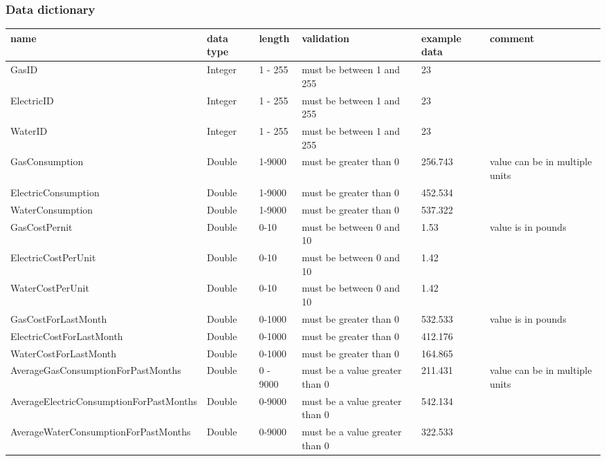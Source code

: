\subsubsection{Data dictionary}
\begin{center}
\begin{tabular}{|p{3cm}|p{1cm}|p{1.5cm}|p{3cm}|p{2cm}|p{3.5cm}|}
	\hline
	\textbf{name} & \textbf{data type} & \textbf{length} & \textbf{validation} & \textbf{example data} & \textbf{comment} \\ \hline
	GasID & Integer & 1 - 255 & must be between 1 and 255 & 23 &  \\ \hline
	ElectricID & Integer & 1 - 255 & must be between 1 and 255 & 23 &  \\ \hline
	WaterID & Integer & 1 - 255 & must be between 1 and 255 & 23 &  \\ \hline
	GasConsumption & Double & 1-9000 & must be greater than 0 & 256.743 & value can be in multiple units \\ \hline
	ElectricConsumption & Double & 1-9000 & must be greater than 0 & 452.534 &  \\ \hline
	WaterConsumption & Double & 1-9000 & must be greater than 0 & 537.322 &  \\ \hline
	GasCostPernit & Double & 0-10 & must be between 0 and 10 & 1.53 & value is in pounds \\ \hline
	ElectricCostPerUnit & Double & 0-10 & must be between 0 and 10 & 1.42 &  \\ \hline
	WaterCostPerUnit & Double & 0-10 & must be between 0 and 10 & 1.42 &  \\ \hline
	GasCostForLastMonth & Double & 0-1000 & must be greater than 0 & 532.533 & value is in pounds \\ \hline
	ElectricCostForLastMonth & Double & 0-1000 & must be greater than 0 & 412.176 &  \\ \hline
	WaterCostForLastMonth & Double & 0-1000 & must be greater than 0 & 164.865 &  \\ \hline
	AverageGasConsumptionForPastMonths & Double & 0 - 9000 & must be a value greater than 0 & 211.431 & value can be in multiple units \\ \hline
	AverageElectricConsumptionForPastMonths & Double & 0-9000 & must be a value greater than 0 & 542.134 &  \\ \hline
	AverageWaterConsumptionForPastMonths & Double & 0-9000 & must be a value greater than 0 & 322.533 & \\ \hline
\end{tabular}
\end{center}
